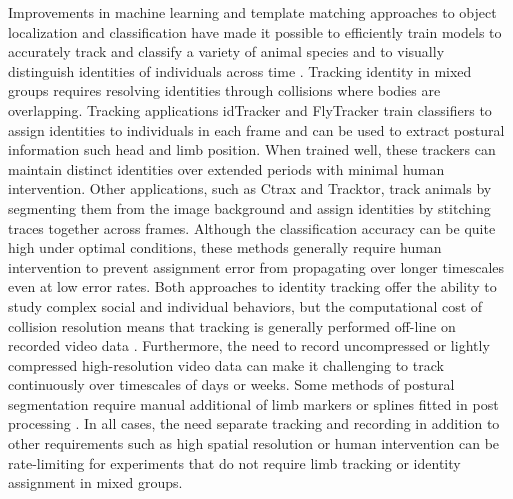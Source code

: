 \documentclass[10pt]{article}
\begin{document}
\begin{multicols}{2}
Improvements in machine learning and template matching approaches to object localization and classification have made it possible to efficiently train models to accurately track and classify a variety of animal species and to visually distinguish identities of individuals across time \cite{Eyjolfsdottir_Detecting_2014,Prez-Escudero_idTracker_2014}. Tracking identity in mixed groups requires resolving identities through collisions where bodies are overlapping. Tracking applications idTracker and FlyTracker train classifiers to assign identities to individuals in each frame and can be used to extract postural information such head and limb position. When trained well, these trackers can maintain distinct identities over extended periods with minimal human intervention. Other applications, such as Ctrax and Tracktor\cite{Branson_High_2009,Rodriguez_ToxId_2017,Sridhar_Tracktor_2018}, track animals by segmenting them from the image background and assign identities by stitching traces together across frames. Although the classification accuracy can be quite high under optimal conditions, these methods generally require human intervention to prevent assignment error from propagating over longer timescales even at low error rates. Both approaches to identity tracking offer the ability to study complex social and individual behaviors, but the computational cost of collision resolution means that tracking is generally performed off-line on recorded video data \cite{Liu_A_2018}. Furthermore, the need to record uncompressed or lightly compressed high-resolution video data can make it challenging to track continuously over timescales of days or weeks. Some methods of postural segmentation require manual additional of limb markers or splines fitted in post processing \cite{Kain_Leg_2013,Uhlmann_FlyLimbTracker_2017}. In all cases, the need separate tracking and recording in addition to other requirements such as high spatial resolution or human intervention can be rate-limiting for experiments that do not require limb tracking or identity assignment in mixed groups. 


\end{multicols}
\end{document}

